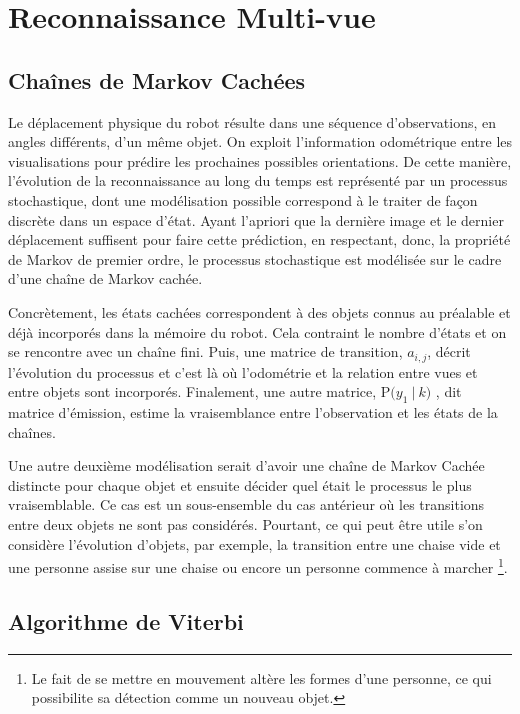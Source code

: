 \section {Reconnaissance Multi-vue}

\subsection {Chaînes de Markov Cachées}

Le déplacement physique du robot résulte dans une séquence
d'observations, en angles différents, d'un même objet. On exploit
l'information odométrique entre les visualisations pour prédire les
prochaines possibles orientations. De cette manière, l'évolution de la
reconnaissance au long du temps est représenté par un processus
stochastique, dont une modélisation possible correspond à le traiter
de façon discrète dans un espace d'état. Ayant l'apriori que la
dernière image et le dernier déplacement suffisent pour faire cette
prédiction, en respectant, donc, la propriété de Markov de premier
ordre, le processus stochastique est modélisée sur le cadre d'une
chaîne de Markov cachée.

Concrètement, les états cachées correspondent à des objets connus au
préalable et déjà incorporés dans la mémoire du robot. Cela contraint le
nombre d'états et on se rencontre avec un chaîne fini. Puis, une
matrice de transition, $a_{i,j}$, décrit l'évolution du processus et c'est là où
l'odométrie et la relation entre vues et entre objets sont
incorporés. Finalement, une autre matrice, $\mathrm{P}\big( y_1 \ | \ k \big)$
, dit matrice d'émission, estime la vraisemblance entre l'observation
et les états de la chaînes.

Une autre deuxième modélisation serait d'avoir une chaîne de Markov
Cachée distincte pour chaque objet et ensuite décider quel était le
processus le plus vraisemblable. Ce cas est un sous-ensemble du cas
antérieur où les transitions entre deux objets ne sont pas
considérés. Pourtant, ce qui peut être utile s'on considère
l'évolution d'objets, par exemple, la transition entre une chaise vide
et une personne assise sur une chaise ou encore un personne
commence à marcher \footnote{Le fait de se mettre en mouvement
  altère les formes d'une personne, ce qui possibilite sa détection
  comme un nouveau objet.}.

\subsection{Algorithme de Viterbi}

